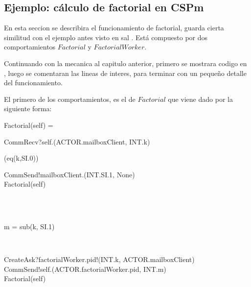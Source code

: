\subsection{Ejemplo: cálculo de factorial en CSPm}
En esta seccion se describira el funcionamiento de factorial, guarda cierta similitud con el ejemplo antes visto en sal \SAL. Está compuesto por dos comportamientos $Factorial$ y $FactorialWorker$.

Continuando con la mecanica al capitulo anterior, primero se mostrara codigo en \CSPm, luego se comentaran las lineas de interes, para terminar con un pequeño detalle del funcionamiento.

El primero de los comportamientos, es el de $Factorial$ que viene dado por la siguiente forma:
\begin{process}
Factorial(self) = {} \\ \quad
  \begin{block}
  CommRecv?self.(ACTOR.mailboxClient, INT.k) \then {} \\ \quad
    \begin{block}
    \If (eq(k,SI.0)) \Then {} \\ \quad
      \begin{block} 
      CommSend!mailboxClient.(INT.SI.1, None) \then \\
      Factorial(self) 
      \end{block} \\
    \Else {} \\ \quad
      \begin{block}
      \begin{declaration}
     m  = sub(k, SI.1) 
	\end{declaration} \\
	\begin{within}
	CreateAsk?factorialWorker.pid!(INT.k, ACTOR.mailboxClient) \then \\
	CommSend!self.(ACTOR.factorialWorker.pid, INT.m) \then \\
	Factorial(self)
	\end{within}
      \end{block}
    \end{block}
  \end{block}
\end{process}


